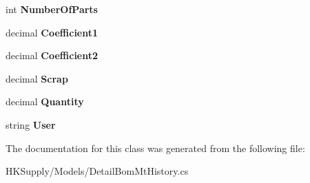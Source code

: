 \begin{DoxyCompactItemize}
\mbox{\label{class_h_k_supply_1_1_models_1_1_detail_bom_mt_history_a80b38327356d35f91fec7f4639b27632}} 
int {\bfseries Number\+Of\+Parts}
\item 
\mbox{\label{class_h_k_supply_1_1_models_1_1_detail_bom_mt_history_a0f725b9ce64c4ef017c0ffbd0b9f0b74}} 
decimal {\bfseries Coefficient1}
\item 
\mbox{\label{class_h_k_supply_1_1_models_1_1_detail_bom_mt_history_ac7a698b3c2a1387dc2380b090e973f1a}} 
decimal {\bfseries Coefficient2}
\item 
\mbox{\label{class_h_k_supply_1_1_models_1_1_detail_bom_mt_history_aee3ddfae27f810ceab5718d89b1233a2}} 
decimal {\bfseries Scrap}
\item 
\mbox{\label{class_h_k_supply_1_1_models_1_1_detail_bom_mt_history_af95570f2daf2199e76cefecd88d3611e}} 
decimal {\bfseries Quantity}
\item 
\mbox{\label{class_h_k_supply_1_1_models_1_1_detail_bom_mt_history_a3526761559936466d7ef0003fa616f7d}} 
string {\bfseries User}
\end{DoxyCompactItemize}


The documentation for this class was generated from the following file\+:\begin{DoxyCompactItemize}
\item 
H\+K\+Supply/\+Models/Detail\+Bom\+Mt\+History.\+cs\end{DoxyCompactItemize}
